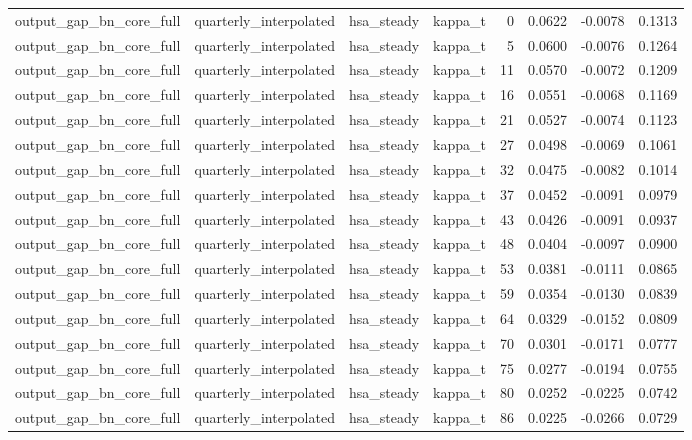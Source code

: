 \begin{tabular}{llllrrrr}
output\_gap\_bn\_core\_full & quarterly\_interpolated & hsa\_steady & kappa\_t & 0 & 0.0622 & -0.0078 & 0.1313 \\
output\_gap\_bn\_core\_full & quarterly\_interpolated & hsa\_steady & kappa\_t & 5 & 0.0600 & -0.0076 & 0.1264 \\
output\_gap\_bn\_core\_full & quarterly\_interpolated & hsa\_steady & kappa\_t & 11 & 0.0570 & -0.0072 & 0.1209 \\
output\_gap\_bn\_core\_full & quarterly\_interpolated & hsa\_steady & kappa\_t & 16 & 0.0551 & -0.0068 & 0.1169 \\
output\_gap\_bn\_core\_full & quarterly\_interpolated & hsa\_steady & kappa\_t & 21 & 0.0527 & -0.0074 & 0.1123 \\
output\_gap\_bn\_core\_full & quarterly\_interpolated & hsa\_steady & kappa\_t & 27 & 0.0498 & -0.0069 & 0.1061 \\
output\_gap\_bn\_core\_full & quarterly\_interpolated & hsa\_steady & kappa\_t & 32 & 0.0475 & -0.0082 & 0.1014 \\
output\_gap\_bn\_core\_full & quarterly\_interpolated & hsa\_steady & kappa\_t & 37 & 0.0452 & -0.0091 & 0.0979 \\
output\_gap\_bn\_core\_full & quarterly\_interpolated & hsa\_steady & kappa\_t & 43 & 0.0426 & -0.0091 & 0.0937 \\
output\_gap\_bn\_core\_full & quarterly\_interpolated & hsa\_steady & kappa\_t & 48 & 0.0404 & -0.0097 & 0.0900 \\
output\_gap\_bn\_core\_full & quarterly\_interpolated & hsa\_steady & kappa\_t & 53 & 0.0381 & -0.0111 & 0.0865 \\
output\_gap\_bn\_core\_full & quarterly\_interpolated & hsa\_steady & kappa\_t & 59 & 0.0354 & -0.0130 & 0.0839 \\
output\_gap\_bn\_core\_full & quarterly\_interpolated & hsa\_steady & kappa\_t & 64 & 0.0329 & -0.0152 & 0.0809 \\
output\_gap\_bn\_core\_full & quarterly\_interpolated & hsa\_steady & kappa\_t & 70 & 0.0301 & -0.0171 & 0.0777 \\
output\_gap\_bn\_core\_full & quarterly\_interpolated & hsa\_steady & kappa\_t & 75 & 0.0277 & -0.0194 & 0.0755 \\
output\_gap\_bn\_core\_full & quarterly\_interpolated & hsa\_steady & kappa\_t & 80 & 0.0252 & -0.0225 & 0.0742 \\
output\_gap\_bn\_core\_full & quarterly\_interpolated & hsa\_steady & kappa\_t & 86 & 0.0225 & -0.0266 & 0.0729 \\

\end{tabular}
